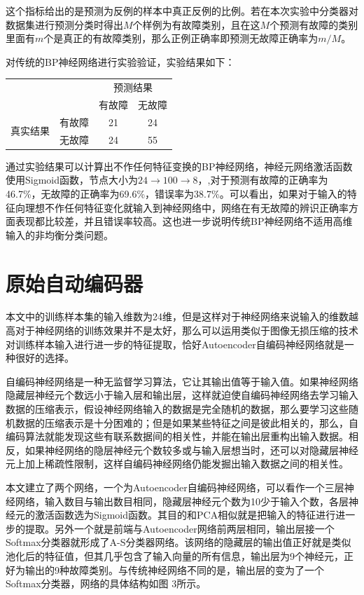 \documentclass{ctacn}%
\begin{document}
\begin{multicols}{2}
这个指标给出的是预测为反例的样本中真正反例的比例。若在本次实验中分类器对数据集进行预测分类时得出$M$个样例为有故障类别，且在这$M$个预测有故障的类别里面有$m$个是真正的有故障类别，那么正例正确率即预测无故障正确率为$m/M$。

对传统的BP神经网络进行实验验证，实验结果如下：


\begin{center}
	\label{tab:3}
	\begin{tabular} {cccc}\toprule
		\multirow{2}{*}[-2pt]{}&\multirow{2}{*}[-2pt]{}&\multicolumn{2}{c}{预测结果}\\
		\cmidrule(lr){3-4}
		&&有故障&无故障\\\hline
		\multirow{2}{*}[-2pt]{真实结果}&有故障&21&24\\
		&无故障&24&55\\
		\bottomrule
\end{tabular}\end{center}

通过实验结果可以计算出不作任何特征变换的BP神经网络，神经元网络激活函数使用Sigmoid函数，节点大小为$24\rightarrow100\rightarrow8$，,对于预测有故障的正确率为46.7\%，无故障的正确率为69.6\%，错误率为38.7\%。可以看出，如果对于输入的特征向理想不作任何特征变化就输入到神经网络中，网络在有无故障的辨识正确率方面表现都比较差，并且错误率较高。这也进一步说明传统BP神经网络不适用高维输入的非均衡分类问题。

\section{原始自动编码器}

本文中的训练样本集的输入维数为24维，但是这样对于神经网络来说输入的维数越高对于神经网络的训练效果并不是太好，那么可以运用类似于图像无损压缩的技术对训练样本输入进行进一步的特征提取，恰好Autoencoder自编码神经网络就是一种很好的选择。

自编码神经网络是一种无监督学习算法，它让其输出值等于输入值。如果神经网络隐藏层神经元个数远小于输入层和输出层，这样就迫使自编码神经网络去学习输入数据的压缩表示，假设神经网络输入的数据是完全随机的数据，那么要学习这些随机数据的压缩表示是十分困难的；但是如果某些特征之间是彼此相关的，那么，自编码算法就能发现这些有联系数据间的相关性，并能在输出层重构出输入数据。相反，如果神经网络的隐层神经元个数较多或与输入层想当时，还可以对隐藏层神经元上加上稀疏性限制，这样自编码神经网络仍能发掘出输入数据之间的相关性。

本文建立了两个网络，一个为Autoencoder自编码神经网络，可以看作一个三层神经网络，输入数目与输出数目相同，隐藏层神经元个数为10少于输入个数，各层神经元的激活函数选为Sigmoid函数。其目的和PCA相似就是把输入的特征进行进一步的提取。另外一个就是前端与Autoencoder网络前两层相同，输出层接一个Softmax分类器就形成了A-S分类器网络。该网络的隐藏层的输出值正好就是类似池化后的特征值，但其几乎包含了输入向量的所有信息，输出层为9个神经元，正好为输出的9种故障类别。与传统神经网络不同的是，输出层的变为了一个Softmax分类器，网络的具体结构如图
3所示。


\end{multicols}
\end{document}

